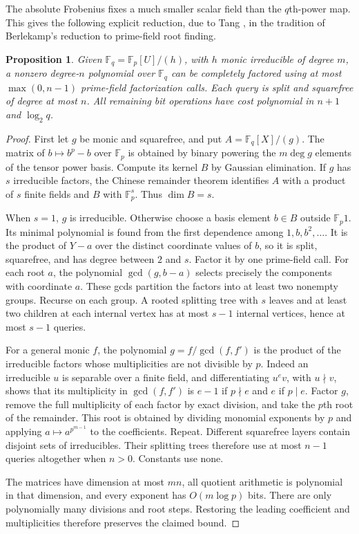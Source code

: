 \documentclass[11pt]{article}
\newtheorem{proposition}[theorem]{Proposition}
\theoremstyle{definition}
\theoremstyle{remark}
\begin{document}
The absolute Frobenius fixes a much smaller scalar field than the
$q$th-power map. This gives the following explicit reduction, due to
Tang \cite[Proposition~3.1, pp.~4--5]{Tang2026}, in the tradition of
Berlekamp's reduction to prime-field root finding.

\begin{proposition}\label{prop:tangfrobenius}
Given $\mathbb F_q=\mathbb F_p[U]/(h)$, with $h$ monic irreducible
of degree $m$, a nonzero degree-$n$ polynomial over $\mathbb F_q$
can be completely factored using at most $\max(0,n-1)$ prime-field
factorization calls. Each query is split and squarefree of degree
at most $n$. All remaining bit operations have cost polynomial in
$n+1$ and $\log_2q$.
\end{proposition}

\begin{proof}
First let $g$ be monic and squarefree, and put
$A=\mathbb F_q[X]/(g)$. The matrix of
$b\mapsto b^p-b$ over $\mathbb F_p$ is obtained by binary powering
the $m\deg g$ elements of the tensor power basis. Compute its kernel
$B$ by Gaussian elimination. If $g$ has $s$ irreducible factors, the
Chinese remainder theorem identifies $A$ with a product of $s$
finite fields and $B$ with $\mathbb F_p^s$. Thus $\dim B=s$.

When $s=1$, $g$ is irreducible. Otherwise choose a basis element
$b\in B$ outside $\mathbb F_p1$. Its minimal polynomial is found
from the first dependence among $1,b,b^2,\ldots$. It is the product
of $Y-a$ over the distinct coordinate values of $b$, so it is split,
squarefree, and has degree between $2$ and $s$. Factor it by one
prime-field call. For each root $a$, the polynomial
$\gcd(g,b-a)$ selects precisely the components with coordinate $a$.
These gcds partition the factors into at least two nonempty groups.
Recurse on each group. A rooted splitting tree with $s$ leaves and
at least two children at each internal vertex has at most $s-1$
internal vertices, hence at most $s-1$ queries.

For a general monic $f$, the polynomial $g=f/\gcd(f,f')$ is the
product of the irreducible factors whose multiplicities are not
divisible by $p$. Indeed an irreducible $u$ is separable over a
finite field, and differentiating $u^ev$, with $u\nmid v$, shows
that its multiplicity in $\gcd(f,f')$ is $e-1$ if $p\nmid e$ and
$e$ if $p\mid e$. Factor $g$, remove the full multiplicity of each
factor by exact division, and take the $p$th root of the remainder.
This root is obtained by dividing monomial exponents by $p$ and
applying $a\mapsto a^{p^{m-1}}$ to the coefficients. Repeat.
Different squarefree layers contain disjoint sets of irreducibles.
Their splitting trees therefore use at most $n-1$ queries altogether
when $n>0$. Constants use none.

The matrices have dimension at most $mn$, all quotient arithmetic
is polynomial in that dimension, and every exponent has
$O(m\log p)$ bits. There are only polynomially many divisions and
root steps. Restoring the leading coefficient and multiplicities
therefore preserves the claimed bound.
\end{proof}
\end{document}
